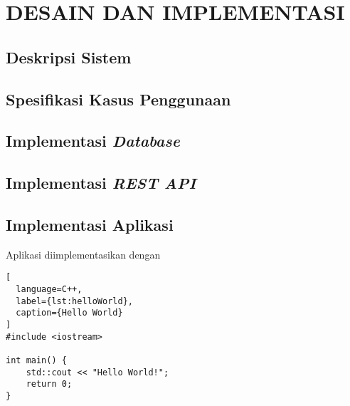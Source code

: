 \chapter{DESAIN DAN IMPLEMENTASI}
\vspace{4ex}

\setlength{\parindent}{7ex}


\section{Deskripsi Sistem}
\vspace{1ex}

\lipsum[1]
\vspace{0.5ex}

\section{Spesifikasi Kasus Penggunaan}

\lipsum[2]
\vspace{0.5ex}

\section{Implementasi \emph{Database}}
\vspace{1ex}

\lipsum[3]
\vspace{0.5ex}

\section{Implementasi \emph{REST API}}
\vspace{1ex}

\lipsum[4]
\vspace{0.5ex}

\section{Implementasi Aplikasi}
\vspace{1ex}

Aplikasi diimplementasikan dengan \lipsum[2]
\vspace{0.5ex}

\newpage

\begin{lstlisting}[
  language=C++,
  label={lst:helloWorld},
  caption={Hello World}
]
#include <iostream>

int main() {
    std::cout << "Hello World!";
    return 0;
}
\end{lstlisting}
\vspace{0.5ex}

